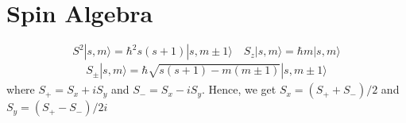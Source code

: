 \documentclass[11pt,a4paper]{article}
\begin{document}
\appendix
\section{Spin Algebra}\label{sec.spin_alegbra}
\begin{equation}
S^2|s ,m \rangle = \hbar^2 s(s+1)|s ,m\pm 1\rangle  \quad S_z|s ,m \rangle = \hbar m |s ,m \rangle
\end{equation}
\begin{align*}
S_{\pm}|s, m\rangle = \hbar\sqrt{s(s+1)-m(m \pm 1)}|s,m \pm 1\rangle
\end{align*}
where $S_+ = S_x + iS_y$ and $S_- = S_x - iS_y $. Hence, we get $S_x = (S_+ + S_-)/2$ and $S_y = (S_+ - S_-)/2i $
 


%
\end{document}
